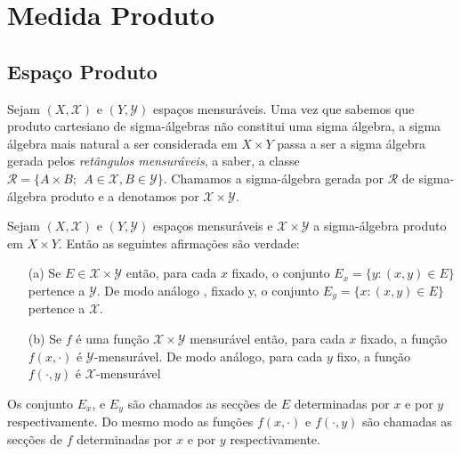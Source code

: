 \chapter[Aula 10]{Medida Produto}
\chaptermark{}

\section{Espaço Produto}

Sejam $(X, \mathscr{X})$ e $(Y, \mathscr{Y})$ espaços mensuráveis. 
Uma vez que sabemos que produto cartesiano de sigma-álgebras não 
constitui uma sigma álgebra, a sigma álgebra mais natural a ser 
considerada em $X\times Y$ passa a ser a sigma álgebra gerada pelos
\emph{retângulos mensuráveis}, a saber, a classe $\mathscr{R}=\{
A\times B;~~A\in \mathscr{X}, B\in \mathscr{Y}\}.$ Chamamos a 
sigma-álgebra gerada por $\mathscr{R}$ de sigma-álgebra produto e 
a denotamos por $\mathscr{X}\times \mathscr{Y}$.



\begin{proposicao}\label{Prod. 1}
Sejam $(X, \mathscr{X})$ e $(Y, \mathscr{Y})$ espaços mensuráveis e 
$\mathscr{X}\times \mathscr{Y}$ a sigma-álgebra produto em $X\times Y$.
Então as seguintes afirmações são verdade:
\begin{itemize}
\item[(a)] Se $E\in \mathscr{X}\times \mathscr{Y}$ então, para cada $x$ fixado,
 o conjunto $E_x=\{y: (x,y)\in E\}$ pertence a $\mathscr{Y}$. De modo análogo 
, fixado y,  o conjunto $E_y=\{x: (x,y)\in E\}$ pertence a $\mathscr{X}$.



\item[(b)] Se $f$ é uma função $\mathscr{X}\times \mathscr{Y}$ mensurável 
então, para cada $x$ fixado, a função $f(x, \cdot)$ é $\mathscr{Y}$-mensurável. De 
modo análogo, para cada $y$ fixo, a função $f(\cdot, y)$ é $\mathscr{X}$-mensurável
\end{itemize}
\end{proposicao}


Os conjunto $E_x$, e $E_y$ são chamados as secções de $E$ determinadas por $x$ e 
por $y$ respectivamente. Do mesmo modo as funções $f(x, \cdot)$ e $f(\cdot, y)$ 
são chamadas as secções de $f$ determinadas por $x$ e por $y$ respectivamente.
\medskip

